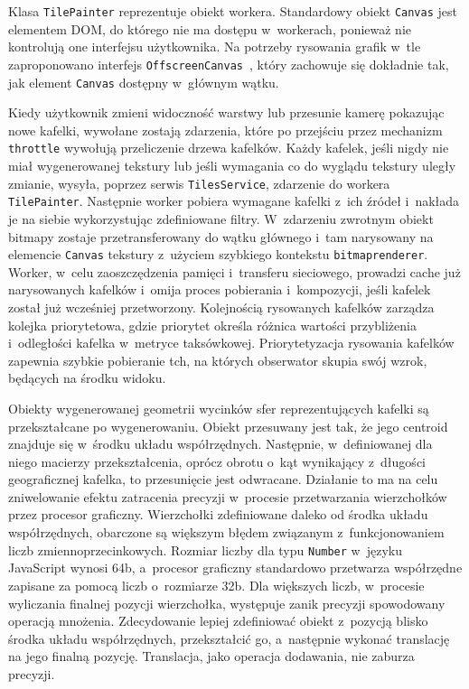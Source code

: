 Klasa \texttt{TilePainter} reprezentuje obiekt workera. Standardowy obiekt \texttt{Canvas} jest elementem DOM, do którego nie ma dostępu w~workerach, ponieważ nie kontrolują one interfejsu użytkownika. Na potrzeby rysowania grafik w~tle zaproponowano interfejs \texttt{OffscreenCanvas}~\cite{OffscreenCanvas}, który zachowuje się dokładnie tak, jak element \texttt{Canvas} dostępny w~głównym wątku.

Kiedy użytkownik zmieni widoczność warstwy lub przesunie kamerę pokazując nowe kafelki, wywołane zostają zdarzenia, które po przejściu przez mechanizm \texttt{throttle} wywołują przeliczenie drzewa kafelków. Każdy kafelek, jeśli nigdy nie miał wygenerowanej tekstury lub jeśli wymagania co do wyglądu tekstury uległy zmianie, wysyła, poprzez serwis \texttt{TilesService}, zdarzenie do workera \texttt{TilePainter}. Następnie worker pobiera wymagane kafelki z~ich źródeł i~nakłada je na siebie wykorzystując zdefiniowane filtry. W~zdarzeniu zwrotnym obiekt bitmapy zostaje przetransferowany do wątku głównego i~tam narysowany na elemencie \texttt{Canvas} tekstury z~użyciem szybkiego kontekstu \texttt{bitmaprenderer}. Worker, w~celu zaoszczędzenia pamięci i~transferu sieciowego, prowadzi cache już narysowanych kafelków i~omija proces pobierania i~kompozycji, jeśli kafelek został już wcześniej przetworzony. Kolejnością rysowanych kafelków zarządza kolejka priorytetowa, gdzie priorytet określa różnica wartości przybliżenia i~odległości kafelka w~metryce taksówkowej. Priorytetyzacja rysowania kafelków zapewnia szybkie pobieranie tch, na których obserwator skupia swój wzrok, będących na środku widoku.

Obiekty wygenerowanej geometrii wycinków sfer reprezentujących kafelki są przekształcane po wygenerowaniu. Obiekt przesuwany jest tak, że jego centroid znajduje się w~środku układu współrzędnych. Następnie, w~definiowanej dla niego macierzy przekształcenia, oprócz obrotu o~kąt wynikający z~długości geograficznej kafelka, to przesunięcie jest odwracane. Działanie to ma na celu zniwelowanie efektu zatracenia precyzji w~procesie przetwarzania wierzchołków przez procesor graficzny. Wierzchołki zdefiniowane daleko od środka układu współrzędnych, obarczone są większym błędem związanym z~funkcjonowaniem liczb zmiennoprzecinkowych. Rozmiar liczby dla typu \texttt{Number} w~języku JavaScript wynosi 64b, a~procesor graficzny standardowo przetwarza współrzędne zapisane za pomocą liczb o~rozmiarze 32b. Dla większych liczb, w~procesie wyliczania finalnej pozycji wierzchołka, występuje zanik precyzji spowodowany operacją mnożenia. Zdecydowanie lepiej zdefiniować obiekt z~pozycją blisko środka układu współrzędnych, przekształcić go, a~następnie wykonać translację na jego finalną pozycję. Translacja, jako operacja dodawania, nie zaburza precyzji.

